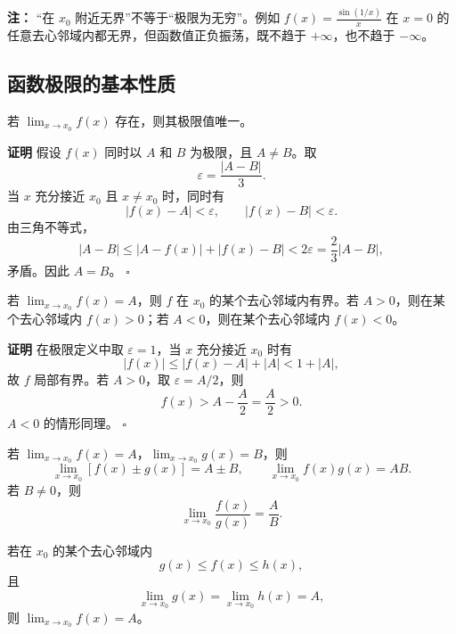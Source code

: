\documentclass[fontset=fandol]{ctexart}
\newenvironment{proofdetail}{\par\noindent\textbf{证明}\quad}{\hfill$\square$\par\vspace{0.8em}}
\newenvironment{warning}{\par\noindent\textbf{注：}\quad}{\par\vspace{0.8em}}
\begin{document}
\begin{warning}
“在 \(x_0\) 附近无界”不等于“极限为无穷”。例如 \(f(x)=\frac{\sin(1/x)}{x}\) 在 \(x=0\) 的任意去心邻域内都无界，但函数值正负振荡，既不趋于 \(+\infty\)，也不趋于 \(-\infty\)。
\end{warning}

\subsection{函数极限的基本性质}

\begin{theorem}[极限的唯一性]
若 \(\lim_{x\to x_0}f(x)\) 存在，则其极限值唯一。
\end{theorem}
\begin{proofdetail}
假设 \(f(x)\) 同时以 \(A\) 和 \(B\) 为极限，且 \(A\neq B\)。取
\[
\varepsilon=\frac{|A-B|}{3}.
\]
当 \(x\) 充分接近 \(x_0\) 且 \(x\neq x_0\) 时，同时有
\[
|f(x)-A|<\varepsilon,\qquad |f(x)-B|<\varepsilon.
\]
由三角不等式，
\[
|A-B|\leq |A-f(x)|+|f(x)-B|<2\varepsilon=\frac23|A-B|,
\]
矛盾。因此 \(A=B\)。
\end{proofdetail}

\begin{proposition}[局部有界性与保号性]
若 \(\lim_{x\to x_0}f(x)=A\)，则 \(f\) 在 \(x_0\) 的某个去心邻域内有界。若 \(A>0\)，则在某个去心邻域内 \(f(x)>0\)；若 \(A<0\)，则在某个去心邻域内 \(f(x)<0\)。
\end{proposition}
\begin{proofdetail}
在极限定义中取 \(\varepsilon=1\)，当 \(x\) 充分接近 \(x_0\) 时有
\[
|f(x)|\leq |f(x)-A|+|A|<1+|A|,
\]
故 \(f\) 局部有界。若 \(A>0\)，取 \(\varepsilon=A/2\)，则
\[
f(x)>A-\frac A2=\frac A2>0.
\]
\(A<0\) 的情形同理。
\end{proofdetail}

\begin{theorem}[四则运算法则]
若 \(\lim_{x\to x_0}f(x)=A\)，\(\lim_{x\to x_0}g(x)=B\)，则
\[
\lim_{x\to x_0}[f(x)\pm g(x)]=A\pm B,\qquad
\lim_{x\to x_0}f(x)g(x)=AB.
\]
若 \(B\neq0\)，则
\[
\lim_{x\to x_0}\frac{f(x)}{g(x)}=\frac AB.
\]
\end{theorem}

\begin{theorem}[夹逼定理]
若在 \(x_0\) 的某个去心邻域内
\[
g(x)\leq f(x)\leq h(x),
\]
且
\[
\lim_{x\to x_0}g(x)=\lim_{x\to x_0}h(x)=A,
\]
则 \(\lim_{x\to x_0}f(x)=A\)。
\end{theorem}
\end{document}
